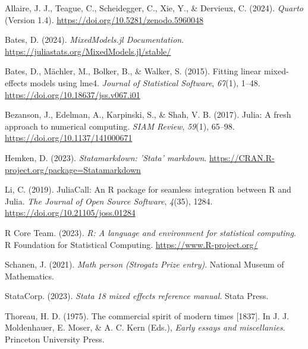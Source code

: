 \documentclass[
  letterpaper,
  DIV=11,
  numbers=noendperiod]{scrreprt}
\newlength{\cslhangindent}
\newenvironment{CSLReferences}[2] %
 {\begin{list}{}{%
  \setlength{\itemindent}{0pt}
  \setlength{\leftmargin}{0pt}
  \setlength{\parsep}{0pt}
  \ifodd #1
   \setlength{\leftmargin}{\cslhangindent}
   \setlength{\itemindent}{-1\cslhangindent}
  \fi
  \setlength{\itemsep}{#2\baselineskip}}}
 {\end{list}}
\begin{document}
\label{refs}
\begin{CSLReferences}{1}{0}
Allaire, J. J., Teague, C., Scheidegger, C., Xie, Y., \& Dervieux, C.
(2024). \emph{{Quarto}} (Version 1.4).
\url{https://doi.org/10.5281/zenodo.5960048}

Bates, D. (2024). \emph{{MixedModels.jl Documentation}}.
\url{https://juliastats.org/MixedModels.jl/stable/}

Bates, D., Mächler, M., Bolker, B., \& Walker, S. (2015). Fitting linear
mixed-effects models using lme4. \emph{Journal of Statistical Software},
\emph{67}(1), 1--48. \url{https://doi.org/10.18637/jss.v067.i01}

Bezanson, J., Edelman, A., Karpinski, S., \& Shah, V. B. (2017). Julia:
A fresh approach to numerical computing. \emph{SIAM Review},
\emph{59}(1), 65--98. \url{https://doi.org/10.1137/141000671}

Hemken, D. (2023). \emph{Statamarkdown: 'Stata' markdown}.
\url{https://CRAN.R-project.org/package=Statamarkdown}

Li, C. (2019). {JuliaCall}: An {R} package for seamless integration
between {R} and {Julia}. \emph{The Journal of Open Source Software},
\emph{4}(35), 1284. \url{https://doi.org/10.21105/joss.01284}

R Core Team. (2023). \emph{R: A language and environment for statistical
computing}. R Foundation for Statistical Computing.
\url{https://www.R-project.org/}

Schanen, J. (2021). \emph{Math person ({Strogatz Prize} entry)}.
National Museum of Mathematics.

StataCorp. (2023). \emph{Stata 18 mixed effects reference manual}. Stata
Press.

Thoreau, H. D. (1975). The commercial spirit of modern times {[}1837{]}.
In J. J. Moldenhauer, E. Moser, \& A. C. Kern (Eds.), \emph{Early essays
and miscellanies}. Princeton University Press.

\end{CSLReferences}
\end{document}
